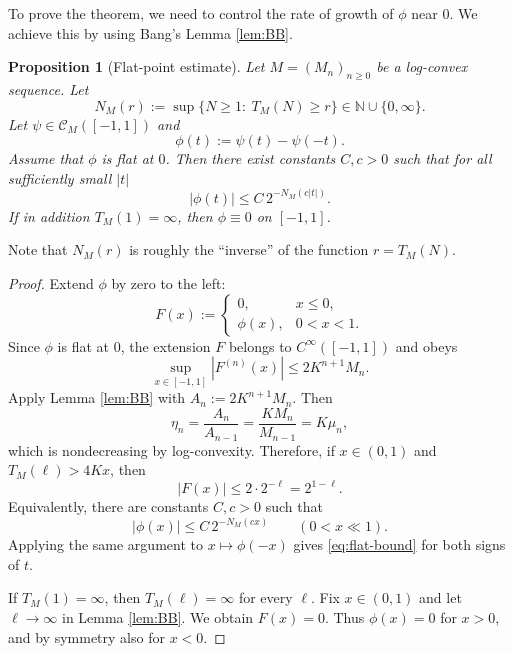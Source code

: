 \documentclass[11pt]{amsart}
\newtheorem{proposition}[theorem]{Proposition}
\newcommand{\N}{\mathbb{N}}
\newcommand{\1}{{\rm 1\hspace*{-0.4ex}%
			\rule{0.1ex}{1.52ex}\hspace*{0.2ex}}}
\newcommand{\CM}{\mathcal{C}_M}
\numberwithin{equation}{section}
\begin{document}
To prove the theorem, we need to control the rate of growth of $\phi$ near 0. We achieve this by using Bang's Lemma \ref{lem:BB}.
\begin{proposition}[Flat-point estimate]\label{prop:flat}
	Let $M=(M_n)_{n\ge 0}$ be a log-convex sequence. Let
	\[
	N_M(r):=\sup\bigl\{N\ge 1:\ T_M(N)\ge r\bigr\}\in \N\cup\{0,\infty\}.
	\]
	Let $\psi\in \CM([-1,1])$ and
	\[
	\phi(t):=\psi(t)-\psi(-t).
	\]
	Assume that $\phi$ is flat at $0$. Then there exist constants $C,c>0$ such that for all sufficiently small $|t|$
	\begin{equation}\label{eq:flat-bound}
		|\phi(t)|\le C\,2^{-N_M(c|t|)}.
	\end{equation}
	If in addition $T_M(1)=\infty$, then $\phi\equiv 0$ on $[-1,1]$.
\end{proposition}
Note that $N_M(r)$ is roughly the ``inverse'' of the function $r=T_M(N)$.
\begin{proof}
	Extend $\phi$ by zero to the left:
	\[
	F(x):=
	\begin{cases}
		0,& x\le 0,\\
		\phi(x),& 0<x<1.
	\end{cases}
	\]
	Since $\phi$ is flat at $0$, the extension $F$ belongs to $C^\infty([-1,1])$ and obeys
	\[
	\sup_{x\in[-1,1]}|F^{(n)}(x)|\le 2K^{n+1}M_n.
	\]
	Apply Lemma \ref{lem:BB} with $A_n:=2K^{n+1}M_n$. Then
	\[
	\eta_n=\frac{A_n}{A_{n-1}}=\frac{KM_n}{M_{n-1}}=K\mu_n,
	\]
	which is nondecreasing by log-convexity. Therefore, if $x\in(0,1)$ and $T_M(\ell)>4Kx$, then
	\[
	|F(x)|\le 2\cdot 2^{-\ell}=2^{1-\ell}.
	\]
	Equivalently, there are constants $C,c>0$ such that
	\[
	|\phi(x)|\le C\,2^{-N_M(cx)}
	\qquad (0<x\ll 1).
	\]
	Applying the same argument to $x\mapsto \phi(-x)$ gives \eqref{eq:flat-bound} for both signs of $t$.
	
	If $T_M(1)=\infty$, then $T_M(\ell)=\infty$ for every $\ell$. Fix $x\in(0,1)$ and let $\ell\to\infty$ in Lemma \ref{lem:BB}. We obtain $F(x)=0$. Thus $\phi(x)=0$ for $x>0$, and by symmetry also for $x<0$.
\end{proof}
\end{document}
